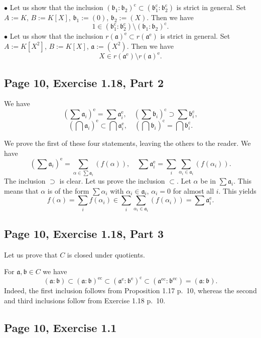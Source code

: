 \documentclass[parskip=half,fontsize=12pt]{scrartcl}%
\newcommand{\oo}{\operatorname}\newcommand{\ooo}{\operatorname*}
\newcommand{\mf}{\mathfrak}
\newcommand{\aaa}{\mf a}
\newcommand{\bbb}{\mf b}
\newcommand{\bu}{\bullet}
\begin{document}
$\bu$ Let us show that the inclusion $(\bbb_1:\bbb_2)^{\oo c}\subset(\bbb_1^{\oo c}:\bbb_2^{\oo c})$ is strict in general. Set $A:=K$, $B:=K[X]$, $\bbb_1:=(0)$, $\bbb_2:=(X)$. Then we have 
$$
1\in(\bbb_1^{\oo c}:\bbb_2^{\oo c})\setminus(\bbb_1:\bbb_2)^{\oo c}.
$$
$\bu$ Let us show that the inclusion $r(\mf a)^{\oo e}\subset r(\mf a^{\oo e})$ is strict in general. Set $A:=K[X^2]$, $B:=K[X]$, $\mf a:=(X^2)$. Then we have 
$$
X\in r(\mf a^{\oo e})\setminus r(\mf a)^{\oo e}.
$$

\subsection{Page 10, Exercise 1.18, Part 2}%

We have 
$$
\left(\sum\mf a_i\right)^{\oo e}=\sum\mf a_i^{\oo e},\quad\left(\sum\bbb_i\right)^{\oo c}\supset\sum\bbb_i^{\oo c},
$$
$$
\left(\bigcap\mf a_i\right)^{\oo e}\subset\bigcap\mf a_i^{\oo e},\quad\left(\bigcap\bbb_i\right)^{\oo c}=\bigcap\bbb_i^{\oo c}.
$$

We prove the first of these four statements, leaving the others to the reader. We have 
$$
\left(\sum\mf a_i\right)^{\oo e}=\sum_{\alpha\in\sum\mf a_i}(f(\alpha)),\quad\sum\mf a_i^{\oo e}=\sum_i\sum_{\alpha_i\in\mf a_i}(f(\alpha_i)).
$$ 
The inclusion $\supset$ is clear. Let us prove the inclusion $\subset$. Let $\alpha$ be in $\sum\mf a_i$. This means that $\alpha$ is of the form $\sum\alpha_i$ with $\alpha_i\in\mf a_i$, $\alpha_i=0$ for almost all $i$. This yields 
$$
f(\alpha)=\sum_if(\alpha_i)\in\sum_i\sum_{\alpha_i\in\mf a_i}(f(\alpha_i))=\sum\mf a_i^{\oo e}.
$$ 

\subsection{Page 10, Exercise 1.18, Part 3}%

Let us prove that $C$ is closed under quotients. 

For $\aaa,\bbb\in C$ we have
$$
(\aaa:\bbb)\subset(\aaa:\bbb)^{\oo{ec}}\subset(\aaa^{\oo e}:\bbb^{\oo e})^{\oo c}\subset(\aaa^{\oo{ec}}:\bbb^{\oo{ec}})=(\aaa:\bbb).
$$ 
Indeed, the first inclusion follows from Proposition 1.17 p.~10, whereas the second and third inclusions follow from Exercise 1.18 p.~10. 

\subsection{Page 10, Exercise 1.1}%
\end{document}
